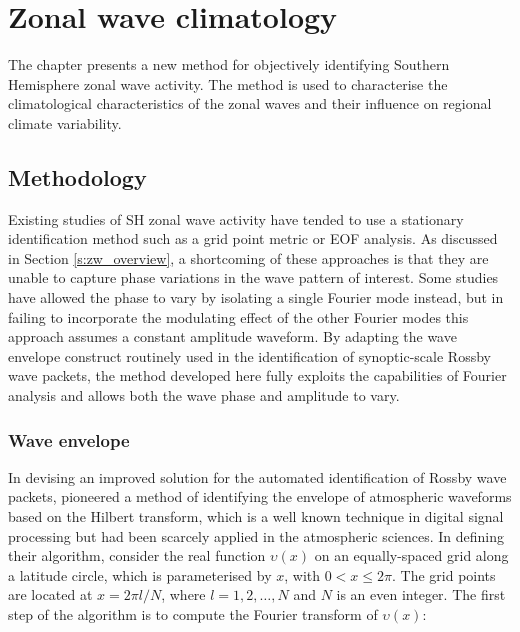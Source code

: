 
\chapter{Zonal wave climatology}\label{c:zw_climatology}


\begin{synopsis}
The chapter presents a new method for objectively identifying Southern Hemisphere zonal wave activity. The method is used to characterise the climatological characteristics of the zonal waves and their influence on regional climate variability.
\end{synopsis}



\section{Methodology}

Existing studies of SH zonal wave activity have tended to use a stationary identification method such as a grid point metric or EOF analysis. As discussed in Section \ref{s:zw_overview}, a shortcoming of these approaches is that they are unable to capture phase variations in the wave pattern of interest. Some studies have allowed the phase to vary by isolating a single Fourier mode instead, but in failing to incorporate the modulating effect of the other Fourier modes this approach assumes a constant amplitude waveform. By adapting the wave envelope construct routinely used in the identification of synoptic-scale Rossby wave packets, the method developed here fully exploits the capabilities of Fourier analysis and allows both the wave phase and amplitude to vary.
 
 
\subsection{Wave envelope}\label{s:envelope}

In devising an improved solution for the automated identification of Rossby wave packets, \citet{Zimin2003} pioneered a method of identifying the envelope of atmospheric waveforms based on the Hilbert transform, which is a well known technique in digital signal processing but had been scarcely applied in the atmospheric sciences. In defining their algorithm, \citet{Zimin2003} consider the real function $\upsilon(x)$ on an equally-spaced grid along a latitude circle, which is parameterised by $x$, with $0 < x \leq 2\pi$. The grid points are located at $x = 2 \pi l / N$, where $l = 1, 2, \dotsc, N$ and $N$ is an even integer. The first step of the algorithm is to compute the Fourier transform of $\upsilon(x)$:

